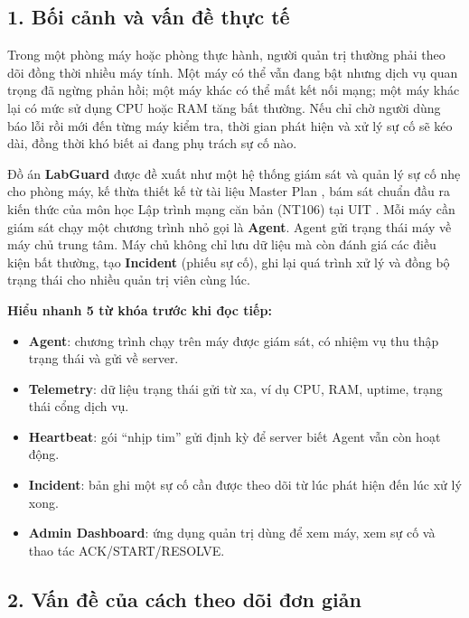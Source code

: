 
\subsection*{1. Bối cảnh và vấn đề thực tế}

Trong một phòng máy hoặc phòng thực hành, người quản trị thường phải theo dõi đồng thời nhiều máy tính. Một máy có thể vẫn đang bật nhưng dịch vụ quan trọng đã ngừng phản hồi; một máy khác có thể mất kết nối mạng; một máy khác lại có mức sử dụng CPU hoặc RAM tăng bất thường. Nếu chỉ chờ người dùng báo lỗi rồi mới đến từng máy kiểm tra, thời gian phát hiện và xử lý sự cố sẽ kéo dài, đồng thời khó biết ai đang phụ trách sự cố nào.

Đồ án \textbf{LabGuard} được đề xuất như một hệ thống giám sát và quản lý sự cố nhẹ cho phòng máy, kế thừa thiết kế từ tài liệu Master Plan \cite{labguard2026}, bám sát chuẩn đầu ra kiến thức của môn học Lập trình mạng căn bản (NT106) tại UIT \cite{uit_nt106_2022}. Mỗi máy cần giám sát chạy một chương trình nhỏ gọi là \textbf{Agent}. Agent gửi trạng thái máy về máy chủ trung tâm. Máy chủ không chỉ lưu dữ liệu mà còn đánh giá các điều kiện bất thường, tạo \textbf{Incident} (phiếu sự cố), ghi lại quá trình xử lý và đồng bộ trạng thái cho nhiều quản trị viên cùng lúc.

\begin{beginnerbox}
\textbf{Hiểu nhanh 5 từ khóa trước khi đọc tiếp:}
\begin{itemize}
    \item \textbf{Agent}: chương trình chạy trên máy được giám sát, có nhiệm vụ thu thập trạng thái và gửi về server.
    \item \textbf{Telemetry}: dữ liệu trạng thái gửi từ xa, ví dụ CPU, RAM, uptime, trạng thái cổng dịch vụ.
    \item \textbf{Heartbeat}: gói ``nhịp tim'' gửi định kỳ để server biết Agent vẫn còn hoạt động.
    \item \textbf{Incident}: bản ghi một sự cố cần được theo dõi từ lúc phát hiện đến lúc xử lý xong.
    \item \textbf{Admin Dashboard}: ứng dụng quản trị dùng để xem máy, xem sự cố và thao tác ACK/START/RESOLVE.
\end{itemize}
\end{beginnerbox}

\subsection*{2. Vấn đề của cách theo dõi đơn giản}

